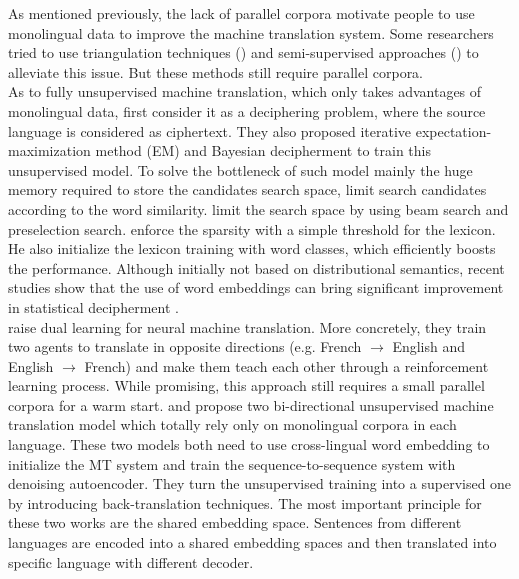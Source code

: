 As mentioned previously, the lack of parallel corpora motivate people to use monolingual data to improve the machine translation system. Some researchers tried to use triangulation techniques (\cite{cohn2007machine}) and semi-supervised approaches (\cite{cheng2016semi}) to alleviate this issue. But these methods still require parallel corpora.\\
As to fully unsupervised machine translation, which only takes advantages of monolingual data, \cite{ravi2011deciphering} first consider it as a deciphering problem, where the source language is considered as ciphertext. They also proposed iterative expectation-maximization method  (EM) and Bayesian decipherment to train this unsupervised model. To solve the bottleneck of such model mainly the huge memory required to store the candidates search space,  \cite{nuhn2012deciphering} limit search candidates according to the word similarity. \cite{nuhn2014decipherment} limit the search space by using beam search and preselection search. \cite{kim2017unsupervised} enforce the sparsity with a simple threshold for the lexicon. He also initialize the lexicon training with word classes, which efficiently boosts the performance. 
Although initially not based on distributional semantics, recent studies show that the use of word embeddings can bring significant improvement in statistical decipherment \cite{duong2016learning}.\\
\cite{he2016dual} raise dual learning for neural machine translation. More concretely, they train two agents to translate in opposite directions (e.g. French ${\rightarrow}$ English and English ${\rightarrow}$ French) and make them teach each other through a reinforcement learning process. While promising, this approach still requires a small parallel corpora for a warm start.  
\cite{artetxe2017unsupervised} and \cite{lample2017unsupervised} propose two bi-directional unsupervised machine translation model which totally rely only on monolingual corpora in each language. These two models both need to use cross-lingual word embedding to initialize the MT system and train the sequence-to-sequence system with denoising autoencoder. They turn the unsupervised training into a supervised one by introducing back-translation techniques. The most important principle for these two works are the shared embedding space. Sentences from different languages are encoded into a shared embedding spaces and then translated into specific language with different decoder.

